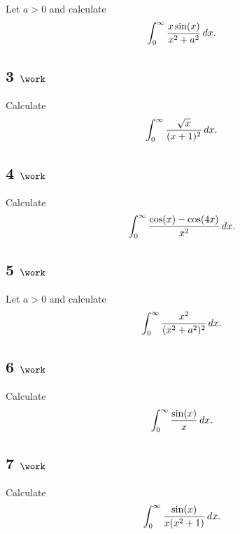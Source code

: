 Let \(a>0\) and calculate
\begin{align*}
\int_0^\infty {x\sin(x) \over x^2 + a^2} \,dx
.\end{align*}

\hypertarget{work-50}{%
\subsection{\texorpdfstring{3
\(\work\)}{3 \textbackslash work}}\label{work-50}}

Calculate
\begin{align*}
\int_0^\infty {\sqrt x \over (x+1)^2} \,dx
.\end{align*}

\hypertarget{work-51}{%
\subsection{\texorpdfstring{4
\(\work\)}{4 \textbackslash work}}\label{work-51}}

Calculate
\begin{align*}
\int_0^\infty {\cos(x) - \cos(4x) \over x^2} \, dx
.\end{align*}

\hypertarget{work-52}{%
\subsection{\texorpdfstring{5
\(\work\)}{5 \textbackslash work}}\label{work-52}}

Let \(a>0\) and calculate
\begin{align*}
\int_0^\infty {x^2 \over (x^2 + a^2)^2} \, dx
.\end{align*}

\hypertarget{work-53}{%
\subsection{\texorpdfstring{6
\(\work\)}{6 \textbackslash work}}\label{work-53}}

Calculate
\begin{align*}
\int_0^\infty {\sin(x) \over x}\, dx
.\end{align*}

\hypertarget{work-54}{%
\subsection{\texorpdfstring{7
\(\work\)}{7 \textbackslash work}}\label{work-54}}

Calculate
\begin{align*}
\int_0^\infty {\sin(x) \over x(x^2+1)}\, dx
.\end{align*}

